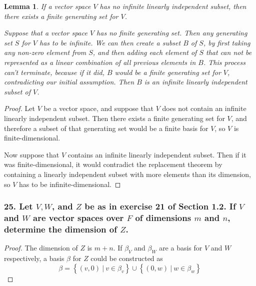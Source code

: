 \documentclass{article}
\newtheorem*{lemma}{Lemma}
\begin{document}
\begin{lemma}
	If a vector space $V$ has no infinite linearly independent subset, then there exists a finite generating set for $V$.

	Suppose that a vector space $V$ has no finite generating set. Then any generating set $S$ for $V$ has to be infinite. We can then create a subset $B$ of $S$, by first taking any non-zero element from $S$, and then adding each element of $S$ that can not be represented as a linear combination of all previous elements in $B$. This process can't terminate, because if it did, $B$ would be a finite generating set for $V$, contradicting our initial assumption. Then $B$ is an infinite linearly independent subset of $V$.
\end{lemma}

\begin{proof}
	Let $V$ be a vector space, and suppose that $V$ does not contain an infinite linearly independent subset. Then there exists a finite generating set for $V$, and therefore a subset of that generating set would be a finite basis for $V$, so $V$ is finite-dimensional.
	
	Now suppose that $V$ contains an infinite linearly independent subset. Then if it was finite-dimensional, it would contradict the replacement theorem by containing a linearly independent subset with more elements than its dimension, so $V$ has to be infinite-dimensional.
\end{proof}

\subsubsection*{25. Let $V, W$, and $Z$ be as in exercise 21 of Section 1.2. If $V$ and $W$ are vector spaces over $F$ of dimensions $m$ and $n$, determine the dimension of $Z$.}

\begin{proof}
	The dimension of $Z$ is $m + n$. If ${\beta}_V$ and ${\beta}_W$ are a basis for $V$ and $W$ respectively, a basis $\beta$ for $Z$ could be constructed as \[\beta = \left\{(v, 0)\ |\ v \in {\beta}_v\right\} \cup \left\{(0, w)\ |\ w \in {\beta}_w \right\}\]
\end{proof}
\end{document}
